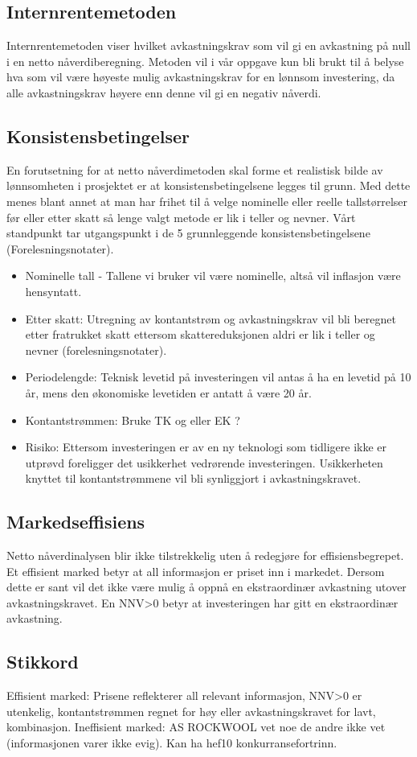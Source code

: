 \subsection{Internrentemetoden}
Internrentemetoden viser hvilket avkastningskrav som vil gi en avkastning på null i en netto nåverdiberegning. Metoden vil i vår oppgave kun bli brukt til å belyse hva som vil være høyeste mulig avkastningskrav for en lønnsom investering, da alle avkastningskrav høyere enn denne vil gi en negativ nåverdi.  

\subsection{Konsistensbetingelser}
En forutsetning for at netto nåverdimetoden skal forme et realistisk bilde av lønnsomheten i prosjektet er at konsistensbetingelsene legges til grunn. Med dette menes blant annet at man har frihet til å velge nominelle eller reelle tallstørrelser før eller etter skatt så lenge valgt metode er lik i teller og nevner. Vårt standpunkt tar utgangspunkt i de 5 grunnleggende konsistensbetingelsene (Forelesningsnotater).

\begin{itemize}
\item Nominelle tall - Tallene vi bruker vil være nominelle, altså vil inflasjon være hensyntatt. 
\item Etter skatt: Utregning av kontantstrøm og avkastningskrav vil bli beregnet etter fratrukket skatt ettersom skattereduksjonen aldri er lik i teller og nevner (forelesningsnotater).
\item Periodelengde: Teknisk levetid på investeringen vil antas å ha en levetid på 10 år, mens den økonomiske levetiden er antatt å være 20 år.
\item Kontantstrømmen: Bruke TK og eller EK ?
\item Risiko: Ettersom investeringen er av en ny teknologi som tidligere ikke er utprøvd foreligger det usikkerhet vedrørende investeringen. Usikkerheten knyttet til kontantstrømmene vil bli synliggjort i avkastningskravet. 
\end{itemize}

\subsection{Markedseffisiens}
Netto nåverdinalysen blir ikke tilstrekkelig uten å redegjøre for effisiensbegrepet. Et effisient marked betyr at all informasjon er priset inn i markedet. Dersom dette er sant vil det ikke være mulig å oppnå en ekstraordinær avkastning utover avkastningskravet. 
En NNV>0 betyr at investeringen har gitt en ekstraordinær avkastning.  

\subsection{Stikkord}
Effisient marked: Prisene reflekterer all relevant informasjon, NNV>0 er utenkelig, kontantstrømmen regnet for høy eller avkastningskravet for lavt, kombinasjon.
Ineffisient marked: AS ROCKWOOL vet noe de andre ikke vet (informasjonen varer ikke evig). Kan ha hef10 konkurransefortrinn. 




